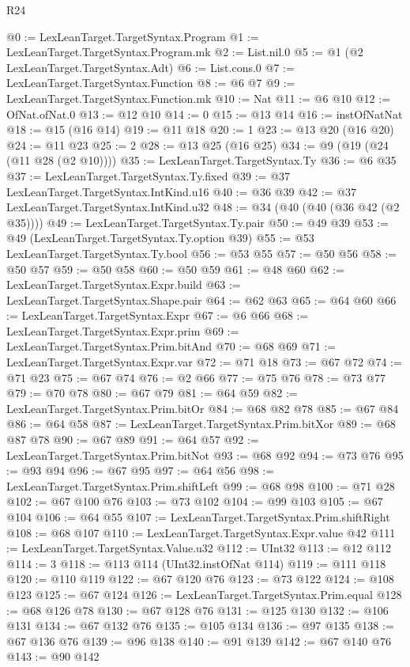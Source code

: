 \begin{lexlean}{R24}
\begin{coremodule}
@0 := LexLeanTarget.TargetSyntax.Program
@1 := LexLeanTarget.TargetSyntax.Program.mk
@2 := List.nil.{0}
@5 := @1 (@2 LexLeanTarget.TargetSyntax.Adt)
@6 := List.cons.{0}
@7 := LexLeanTarget.TargetSyntax.Function
@8 := @6 @7
@9 := LexLeanTarget.TargetSyntax.Function.mk
@10 := Nat
@11 := @6 @10
@12 := OfNat.ofNat.{0}
@13 := @12 @10
@14 := 0
@15 := @13 @14
@16 := instOfNatNat
@18 := @15 (@16 @14)
@19 := @11 @18
@20 := 1
@23 := @13 @20 (@16 @20)
@24 := @11 @23
@25 := 2
@28 := @13 @25 (@16 @25)
@34 := @9 (@19 (@24 (@11 @28 (@2 @10))))
@35 := LexLeanTarget.TargetSyntax.Ty
@36 := @6 @35
@37 := LexLeanTarget.TargetSyntax.Ty.fixed
@39 := @37 LexLeanTarget.TargetSyntax.IntKind.u16
@40 := @36 @39
@42 := @37 LexLeanTarget.TargetSyntax.IntKind.u32
@48 := @34 (@40 (@40 (@36 @42 (@2 @35))))
@49 := LexLeanTarget.TargetSyntax.Ty.pair
@50 := @49 @39
@53 := @49 (LexLeanTarget.TargetSyntax.Ty.option @39)
@55 := @53 LexLeanTarget.TargetSyntax.Ty.bool
@56 := @53 @55
@57 := @50 @56
@58 := @50 @57
@59 := @50 @58
@60 := @50 @59
@61 := @48 @60
@62 := LexLeanTarget.TargetSyntax.Expr.build
@63 := LexLeanTarget.TargetSyntax.Shape.pair
@64 := @62 @63
@65 := @64 @60
@66 := LexLeanTarget.TargetSyntax.Expr
@67 := @6 @66
@68 := LexLeanTarget.TargetSyntax.Expr.prim
@69 := LexLeanTarget.TargetSyntax.Prim.bitAnd
@70 := @68 @69
@71 := LexLeanTarget.TargetSyntax.Expr.var
@72 := @71 @18
@73 := @67 @72
@74 := @71 @23
@75 := @67 @74
@76 := @2 @66
@77 := @75 @76
@78 := @73 @77
@79 := @70 @78
@80 := @67 @79
@81 := @64 @59
@82 := LexLeanTarget.TargetSyntax.Prim.bitOr
@84 := @68 @82 @78
@85 := @67 @84
@86 := @64 @58
@87 := LexLeanTarget.TargetSyntax.Prim.bitXor
@89 := @68 @87 @78
@90 := @67 @89
@91 := @64 @57
@92 := LexLeanTarget.TargetSyntax.Prim.bitNot
@93 := @68 @92
@94 := @73 @76
@95 := @93 @94
@96 := @67 @95
@97 := @64 @56
@98 := LexLeanTarget.TargetSyntax.Prim.shiftLeft
@99 := @68 @98
@100 := @71 @28
@102 := @67 @100 @76
@103 := @73 @102
@104 := @99 @103
@105 := @67 @104
@106 := @64 @55
@107 := LexLeanTarget.TargetSyntax.Prim.shiftRight
@108 := @68 @107
@110 := LexLeanTarget.TargetSyntax.Expr.value @42
@111 := LexLeanTarget.TargetSyntax.Value.u32
@112 := UInt32
@113 := @12 @112
@114 := 3
@118 := @113 @114 (UInt32.instOfNat @114)
@119 := @111 @118
@120 := @110 @119
@122 := @67 @120 @76
@123 := @73 @122
@124 := @108 @123
@125 := @67 @124
@126 := LexLeanTarget.TargetSyntax.Prim.equal
@128 := @68 @126 @78
@130 := @67 @128 @76
@131 := @125 @130
@132 := @106 @131
@134 := @67 @132 @76
@135 := @105 @134
@136 := @97 @135
@138 := @67 @136 @76
@139 := @96 @138
@140 := @91 @139
@142 := @67 @140 @76
@143 := @90 @142

\end{coremodule}
\end{lexlean}
